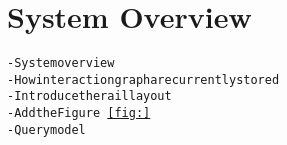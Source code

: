 \section{System Overview}\label{sec:system}
\begin{alltt}\scriptsize
- System overview
    - How interaction graph are currently stored
    - Introduce the rail layout
    - Add the Figure~\ref{fig:}
    - Query model
\end{alltt}
